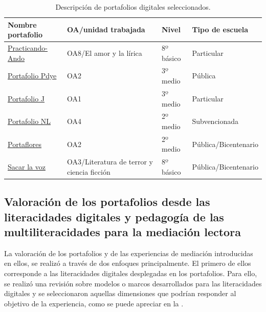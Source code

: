 \begin{table}[!htpb]
\centering
\begin{threeparttable}
\caption{Descripción de portafolios digitales seleccionados.}
\label{tab-01}
\begin{tabular}{lp{2cm}ll}
\toprule
Nombre portafolio & OA/unidad trabajada & Nivel & Tipo de escuela\\
\midrule
\href{https://sites.google.com/view/portafolio-sergio-gonzlez/practicando-ando}{Practicando-Ando} & OA8/El amor y la lírica & 8º básico & Particular \\
\href{https://sites.google.com/view/portafolio-pdye/inicio}{Portafolio Pdye} & OA2 & 3º medio & Pública \\
\href{https://sites.google.com/view/portafoliojos/inicio}{Portafolio J} & OA1 & 3º medio & Particular \\
\href{https://sites.google.com/view/portafolio-nicolas-lagos/inicio}{Portafolio NL} & OA4 & 2º medio & Subvencionada \\
\href{https://sites.google.com/view/rosaerium-portaflores/inicio}{Portaflores} & OA2 & 2º medio & Pública/Bicentenario \\
\href{https://sites.google.com/ug.uchile.cl/sacarlavoz/inicio}{Sacar la voz} & OA3/Literatura de terror y ciencia ficción & 8º básico & Pública/Bicentenario \\
\bottomrule
\end{tabular}
\end{threeparttable}
\end{table}
	
\subsection{Valoración de los portafolios desde las literacidades digitales y pedagogía de las multiliteracidades para la mediación lectora}\label{sub-sec-valorazióndelos}

La valoración de los portafolios y de las experiencias de mediación introducidas en ellos, se realizó a través de dos enfoques principalmente. El primero de ellos corresponde a las literacidades digitales desplegadas en los portafolios. Para ello, se realizó una revisión sobre modelos o marcos desarrollados para las literacidades digitales \cite{gillen_barton_2010,hafner_chik_jones_2015} y se seleccionaron aquellas dimensiones que podrían responder al objetivo de la experiencia, como se puede apreciar en la .
	
